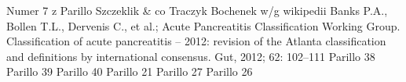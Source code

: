 \documentclass[a4paper, 12pt]{report}
\begin{document}
\begin{thebibliography}{99}
 Numer 7 z Parillo
 Szczeklik \& co
 Traczyk
 Bochenek w/g wikipedii
 Banks P.A., Bollen T.L., Dervenis C., et al.; Acute
  Pancreatitis Classification Working Group. Classification of acute
  pancreatitis – 2012: revision of the Atlanta classification and
  definitions by international consensus. Gut, 2012; 62: 102–111
 Parillo 38
 Parillo 39
 Parillo 40
 Parillo 21
 Parillo 27
 Parillo 26
\end{thebibliography}
\end{document}
